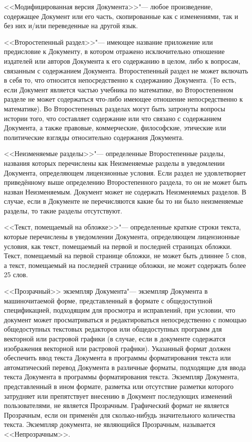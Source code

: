 <<Модифицированная версия Документа>>"--- любое произведение, содержащее
Документ или его часть, скопированные как с изменениями, так и без них
и/или переведенные на другой язык.

<<Второстепенный раздел>>"--- имеющее название приложение или предисловие
к Документу, в котором отражено исключительно отношение издателей или
авторов Документа к его содержанию в целом, либо к вопросам, связанным с
содержанием Документа. Второстепенный раздел не может включать в себя то,
что относится непосредственно к содержанию Документа. (То есть, если
Документ является частью учебника по математике, во Второстепенном
разделе не может содержаться что-либо имеющее отношение непосредственно
к математике). Во Второстепенных разделах могут быть затронуты вопросы
истории того, что составляет содержание или что связано с содержанием
Документа, а также правовые, коммерческие, философские, этические или
политические взгляды относительно содержания Документа.

<<Неизменяемые разделы>>"--- определенные Второстепенные разделы,
названия которых перечислены как Неизменяемые разделы в уведомлении
Документа, определяющем лицензионные условия. Если раздел не
удовлетворяет приведённому выше определению Второстепенного раздела, то
он не может быть назван Неизменяемым. Документ может не содержать
Неизменяемых разделов. В случае, если в Документе не перечисляются какие
бы то ни было неизменяемые разделы, то такие разделы отсутствуют.

<<Текст, помещаемый на обложке>>"--- определенные краткие строки текста,
которые перечислены в уведомлении Документа, определяющем лицензионные
условия, как текст, помещаемый на первой и последней страницах обложки.
Текст, помещаемый на первой странице обложки, не может быть длиннее 5
слов, а текст, помещаемый на последней странице обложки, не может
содержать более 25 слов.

<<Прозрачный>> экземпляр Документа"--- экземпляр Документа в
машиночитаемой форме, представленный в формате с общедоступной
спецификацией, подходящим для просмотра и исправлений, при условии, что
документ может просматриваться и редактироваться непосредственно с
помощью общедоступных текстовых редакторов или общедоступных программ
для векторной или растровой графики (в случае, если в документе
содержатся изображения векторной или растровой графики). Указанный
формат должен обеспечить ввод текста Документа в программы форматирования
текста или автоматический перевод Документа в различные форматы,
подходящие для ввода текста Документа в программы форматирования текста.
Экземпляр Документа, представленный в ином формате, разметка или
отсутствие разметки которого затрудняет или препятствует внесению в
Документ последующих изменений пользователями, не является Прозрачным.
Графический формат не является Прозрачным, если он применён для
сколько-нибудь значительного количества текста. Экземпляр документа, не
являющийся Прозрачным, называется <<Непрозрачным>>.

